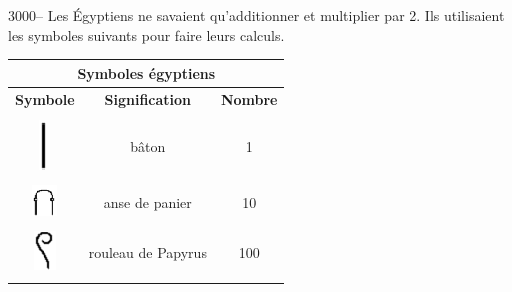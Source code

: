 \documentclass[letterpaper, 12pt]{article}
\begin{document}
3000-- Les \'Egyptiens ne savaient qu'additionner et multiplier par 2. Ils utilisaient les symboles suivants pour faire leurs calculs.\\

\begin{center}
\begin{tabular}{|c|c|c|}
\multicolumn{3}{c}{\bf Symboles \'egyptiens}\\[2mm] \hline
{\bf Symbole} & {\bf Signification} & {\bf Nombre}  \\ \hline \hline
 & & \\
\includegraphics[scale=0.8]{Hiero1.eps} & b\^aton & 1\\[4mm] \hline
 & & \\
\includegraphics[scale=1.6]{Hiero10.eps} & anse de panier & 10\\[4mm] \hline
 & & \\
\includegraphics[scale=1.5]{Hiero100.eps} & rouleau de Papyrus & 100\\[4mm] \hline
 & & \\

\end{tabular}
\end{center}
\end{document}
